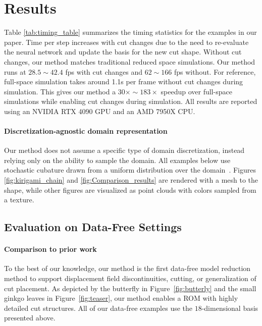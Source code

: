 \section{Results}


Table \ref{tab:timing_table} summarizes the timing statistics for the examples in our paper. Time per step increases with cut changes due to the need to re-evaluate the neural network and update the basis for the new cut shape. Without cut changes, our method matches traditional reduced space simulations. Our method runs at $28.5 \sim 42.4$ fps with cut changes and $62 \sim 166$ fps without. For reference, full-space simulation takes around 1.1s per frame without cut changes during simulation. This gives our method a $30\times \sim 183\times$ speedup over full-space simulations while enabling cut changes during simulation. All results are reported using an NVIDIA RTX 4090 GPU and an AMD 7950X CPU. 

\paragraph{Discretization-agnostic domain representation} Our method does not assume a specific type of domain discretization, instead relying only on the ability to sample the domain. All examples below use stochastic cubature drawn from a uniform distribution over the domain~\cite{chang:2023:licrom,Modi:2024:Simplicits}. Figures \ref{fig:kirigami_chain} and \ref{fig:Comparison_results} are rendered with a mesh  to the shape, while other figures are visualized as point clouds with colors sampled from a texture.



\subsection{Evaluation on Data-Free Settings}

\paragraph{Comparison to prior work}
To the best of our knowledge, our method is the first data-free model reduction method to support displacement field discontinuities,  cutting, or generalization of cut placement. As depicted by the butterfly in Figure~\ref{fig:butterly} and the small ginkgo leaves in Figure~\ref{fig:teaser}, our method enables a ROM with highly detailed cut structures. All of our data-free examples use the $18$-dimensional basis presented above. 



